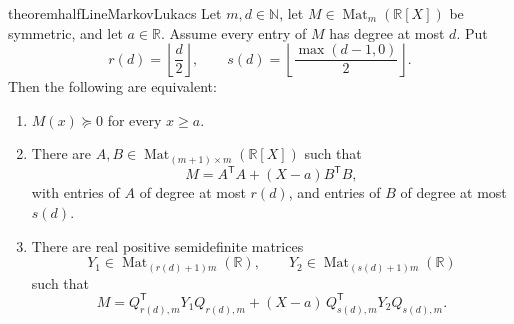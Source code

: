 \documentclass[uplatex,dvipdfmx]{jsarticle}
\newcommand{\Poly}{\mathbb{R}[X]}
\newcommand{\Mat}{\operatorname{Mat}}
\newcommand{\psd}{\succeq 0}
\theoremstyle{matrixsosdefinition}
\begin{document}
\begin{restatable}{theorem}{halfLineMarkovLukacs}
  Let \(m,d\in\mathbb{N}\), let \(M\in\Mat_m(\Poly)\) be symmetric, and let
  \(a\in\mathbb{R}\).
  Assume every entry of \(M\) has degree at most \(d\).  Put
  \[
    r(d)=\left\lfloor\frac{d}{2}\right\rfloor,\qquad
    s(d)=\left\lfloor\frac{\max(d-1,0)}{2}\right\rfloor.
  \]
  Then the following are equivalent:
  \begin{enumerate}[label=(\arabic*)]
    \item \(M(x)\psd\) for every \(x\ge a\).
    \item There are \(A,B\in\Mat_{(m+1)\times m}(\Poly)\) such that
      \[
        M=A^{\mathsf T}A+(X-a)B^{\mathsf T}B,
      \]
      with entries of \(A\) of degree at most \(r(d)\), and entries of \(B\) of
      degree at most \(s(d)\).
    \item There are real positive semidefinite matrices
      \[
        Y_1\in\Mat_{(r(d)+1)m}(\mathbb{R}),\qquad
        Y_2\in\Mat_{(s(d)+1)m}(\mathbb{R})
      \]
      such that
      \[
        M =
        Q_{r(d),m}^{\mathsf T}Y_1Q_{r(d),m}
        +
        (X-a)\,Q_{s(d),m}^{\mathsf T}Y_2Q_{s(d),m}.
      \]
  \end{enumerate}
\end{restatable}
\end{document}
